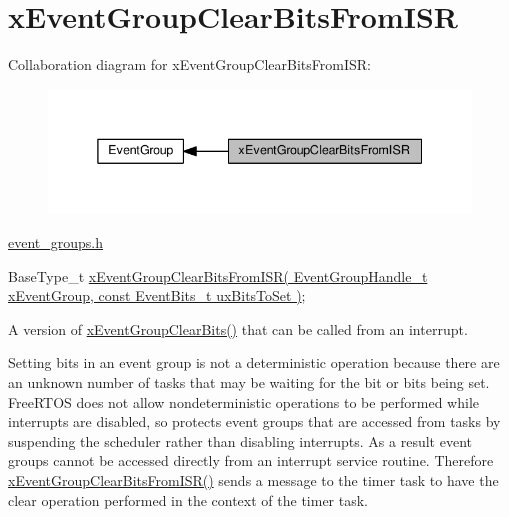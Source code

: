 \hypertarget{group__xEventGroupClearBitsFromISR}{}\section{x\+Event\+Group\+Clear\+Bits\+From\+I\+SR}
\label{group__xEventGroupClearBitsFromISR}
Collaboration diagram for x\+Event\+Group\+Clear\+Bits\+From\+I\+SR\+:\nopagebreak
\begin{figure}[H]
\begin{center}
\leavevmode
\includegraphics[width=338pt]{d4/dc0/group__xEventGroupClearBitsFromISR}
\end{center}
\end{figure}
\hyperlink{event__groups_8h}{event\+\_\+groups.\+h} 
\begin{DoxyPre}
   BaseType\_t \hyperlink{event__groups_8h_a3d7de214a697f33fe7b914e26a93f33a}{xEventGroupClearBitsFromISR( EventGroupHandle\_t xEventGroup, const EventBits\_t uxBitsToSet )};
\end{DoxyPre}


A version of \hyperlink{event__groups_8h_a0fb72cfdd4f0d5f86d955fc3af448f2a}{x\+Event\+Group\+Clear\+Bits()} that can be called from an interrupt.

Setting bits in an event group is not a deterministic operation because there are an unknown number of tasks that may be waiting for the bit or bits being set. Free\+R\+T\+OS does not allow nondeterministic operations to be performed while interrupts are disabled, so protects event groups that are accessed from tasks by suspending the scheduler rather than disabling interrupts. As a result event groups cannot be accessed directly from an interrupt service routine. Therefore \hyperlink{event__groups_8h_a3d7de214a697f33fe7b914e26a93f33a}{x\+Event\+Group\+Clear\+Bits\+From\+I\+S\+R()} sends a message to the timer task to have the clear operation performed in the context of the timer task.


